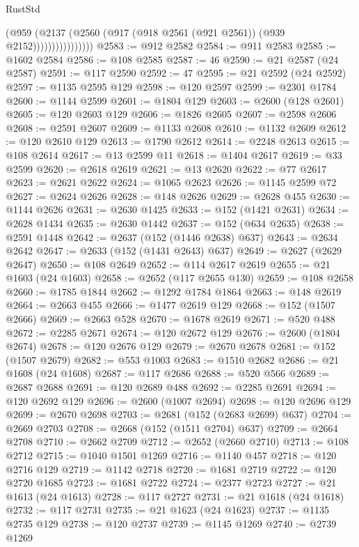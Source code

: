 \begin{lexlean}{RustStd}
\begin{coremodule}
                          (@959
                            (@2137
                              (@2560 (@917 (@918 @2561 (@921 @2561)) (@939 @2152))))))))))))))))
@2583 := @912 @2582
@2584 := @911 @2583
@2585 := @1602 @2584
@2586 := @108 @2585
@2587 := 46
@2590 := @21 @2587 (@24 @2587)
@2591 := @117 @2590
@2592 := 47
@2595 := @21 @2592 (@24 @2592)
@2597 := @1135 @2595 @129
@2598 := @120 @2597
@2599 := @2301 @1784
@2600 := @1144 @2599
@2601 := @1804 @129
@2603 := @2600 (@128 @2601)
@2605 := @120 @2603 @129
@2606 := @1826 @2605
@2607 := @2598 @2606
@2608 := @2591 @2607
@2609 := @1133 @2608
@2610 := @1132 @2609
@2612 := @120 @2610 @129
@2613 := @1790 @2612
@2614 := @2248 @2613
@2615 := @108 @2614
@2617 := @13 @2599 @11
@2618 := @1404 @2617
@2619 := @33 @2599
@2620 := @2618 @2619
@2621 := @13 @2620
@2622 := @77 @2617
@2623 := @2621 @2622
@2624 := @1065 @2623
@2626 := @1145 @2599 @72
@2627 := @2624 @2626
@2628 := @148 @2626
@2629 := @2628 @455
@2630 := @1144 @2626
@2631 := @2630 @1425
@2633 := @152 (@1421 @2631)
@2634 := @2628 @1434
@2635 := @2630 @1442
@2637 := @152 (@634 @2635)
@2638 := @2591 @1448
@2642 := @2637 (@152 (@1446 @2638) @637)
@2643 := @2634 @2642
@2647 := @2633 (@152 (@1431 @2643) @637)
@2649 := @2627 (@2629 @2647)
@2650 := @108 @2649
@2652 := @114 @2617 @2619
@2655 := @21 @1603 (@24 @1603)
@2658 := @2652 (@117 @2655 @130)
@2659 := @108 @2658
@2660 := @1785 @1844
@2662 := @1292 @1784 @1864
@2663 := @148 @2619
@2664 := @2663 @455
@2666 := @1477 @2619 @129
@2668 := @152 (@1507 @2666)
@2669 := @2663 @528
@2670 := @1678 @2619
@2671 := @520 @488
@2672 := @2285 @2671
@2674 := @120 @2672 @129
@2676 := @2600 (@1804 @2674)
@2678 := @120 @2676 @129
@2679 := @2670 @2678
@2681 := @152 (@1507 @2679)
@2682 := @553 @1003
@2683 := @1510 @2682
@2686 := @21 @1608 (@24 @1608)
@2687 := @117 @2686
@2688 := @520 @566
@2689 := @2687 @2688
@2691 := @120 @2689 @488
@2692 := @2285 @2691
@2694 := @120 @2692 @129
@2696 := @2600 (@1007 @2694)
@2698 := @120 @2696 @129
@2699 := @2670 @2698
@2703 := @2681 (@152 (@2683 @2699) @637)
@2704 := @2669 @2703
@2708 := @2668 (@152 (@1511 @2704) @637)
@2709 := @2664 @2708
@2710 := @2662 @2709
@2712 := @2652 (@2660 @2710)
@2713 := @108 @2712
@2715 := @1040 @1501 @1269
@2716 := @1140 @457
@2718 := @120 @2716 @129
@2719 := @1142 @2718
@2720 := @1681 @2719
@2722 := @120 @2720 @1685
@2723 := @1681 @2722
@2724 := @2377 @2723
@2727 := @21 @1613 (@24 @1613)
@2728 := @117 @2727
@2731 := @21 @1618 (@24 @1618)
@2732 := @117 @2731
@2735 := @21 @1623 (@24 @1623)
@2737 := @1135 @2735 @129
@2738 := @120 @2737
@2739 := @1145 @1269
@2740 := @2739 @1269

\end{coremodule}
\end{lexlean}

